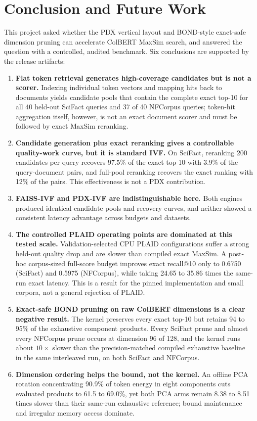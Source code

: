 \section{Conclusion and Future Work}
\label{sec:conclusion}

This project asked whether the PDX vertical layout and BOND-style exact-safe
dimension pruning can accelerate ColBERT MaxSim search, and answered the
question with a controlled, audited benchmark. Six conclusions are supported
by the release artifacts:

\begin{enumerate}
  \item \textbf{Flat token retrieval generates high-coverage candidates but is
    not a scorer.} Indexing individual token vectors and mapping hits back to
    documents yields candidate pools that contain the complete exact top-10
    for all 40 held-out SciFact queries and 37 of 40 NFCorpus queries;
    token-hit aggregation itself, however, is not an exact document scorer and
    must be followed by exact MaxSim reranking.
  \item \textbf{Candidate generation plus exact reranking gives a controllable
    quality-work curve, but it is standard IVF.} On SciFact, reranking 200
    candidates per query recovers 97.5\% of the exact top-10 with 3.9\% of the
    query-document pairs, and full-pool reranking recovers the exact ranking
    with 12\% of the pairs. This effectiveness is not a PDX contribution.
  \item \textbf{FAISS-IVF and PDX-IVF are indistinguishable here.} Both
    engines produced identical candidate pools and recovery curves, and
    neither showed a consistent latency advantage across budgets and datasets.
  \item \textbf{The controlled PLAID operating points are dominated at this
    tested scale.} Validation-selected CPU PLAID configurations suffer a
    strong held-out quality drop and are slower than compiled exact MaxSim. A
    post-hoc corpus-sized full-score budget improves exact recall@10 only to
    0.6750 (SciFact) and 0.5975 (NFCorpus), while taking 24.65 to 35.86 times the
    same-run exact latency. This is a result for the pinned implementation and
    small corpora, not a general rejection of PLAID.
  \item \textbf{Exact-safe BOND pruning on raw ColBERT dimensions is a clear
    negative result.} The kernel preserves every exact top-10 but retains
    94 to 95\% of the exhaustive component products. Every SciFact prune and
    almost every NFCorpus prune occurs at dimension 96 of 128, and the kernel
    runs about $10\times$ slower than the
    precision-matched compiled exhaustive baseline in the same interleaved
    run, on both SciFact and NFCorpus.
  \item \textbf{Dimension ordering helps the bound, not the kernel.} An
    offline PCA rotation concentrating 90.9\% of token energy in eight
    components cuts evaluated products to 61.5 to 69.0\%, yet both PCA arms
    remain 8.38 to 8.51 times slower than their same-run exhaustive reference;
    bound maintenance and irregular memory access dominate.
\end{enumerate}

